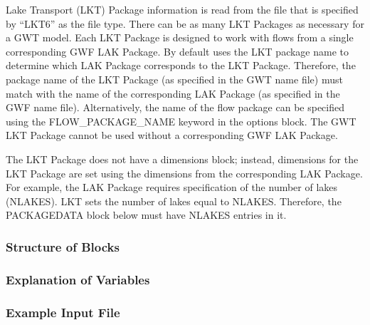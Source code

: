 Lake Transport (LKT) Package information is read from the file that is specified by ``LKT6'' as the file type.  There can be as many LKT Packages as necessary for a GWT model. Each LKT Package is designed to work with flows from a single corresponding GWF LAK Package. By default \mf uses the LKT package name to determine which LAK Package corresponds to the LKT Package.  Therefore, the package name of the LKT Package (as specified in the GWT name file) must match with the name of the corresponding LAK Package (as specified in the GWF name file).  Alternatively, the name of the flow package can be specified using the FLOW\_PACKAGE\_NAME keyword in the options block.  The GWT LKT Package cannot be used without a corresponding GWF LAK Package.

The LKT Package does not have a dimensions block; instead, dimensions for the LKT Package are set using the dimensions from the corresponding LAK Package.  For example, the LAK Package requires specification of the number of lakes (NLAKES).  LKT sets the number of lakes equal to NLAKES.  Therefore, the PACKAGEDATA block below must have NLAKES entries in it.

\vspace{5mm}
\subsubsection{Structure of Blocks}




\vspace{5mm}
\subsubsection{Explanation of Variables}
\begin{description}

\end{description}

\vspace{5mm}
\subsubsection{Example Input File}


\vspace{5mm}
